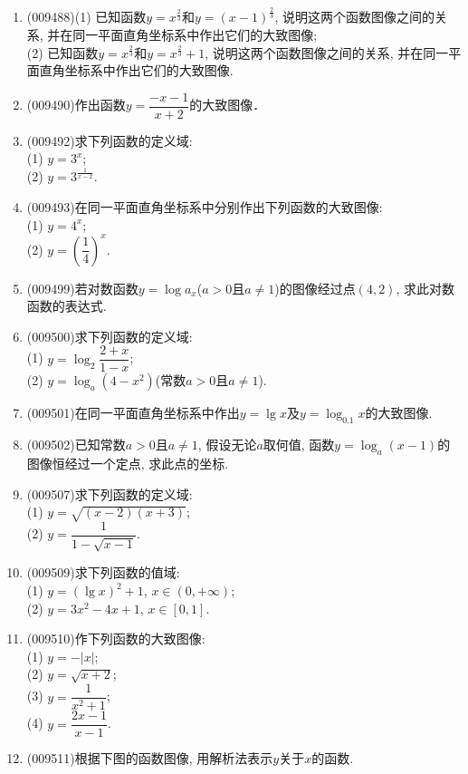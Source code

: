 \documentclass[10pt,a4paper]{article}
\begin{document}
\begin{enumerate}[1.]
\item {\tiny (009488)}(1) 已知函数$y=x^{\frac 23}$和$y=(x-1)^{\frac 23}$, 说明这两个函数图像之间的关系, 并在同一平面直角坐标系中作出它们的大致图像;\\
(2) 已知函数$y=x^{\frac 23}$和$y=x^{\frac 23}+1$, 说明这两个函数图像之间的关系, 并在同一平面直角坐标系中作出它们的大致图像.
\item {\tiny (009490)}作出函数$y=\dfrac{-x-1}{x+2}$的大致图像．
\item {\tiny (009492)}求下列函数的定义域:\\
(1) $y=3^x$;\\
(2) $y=3^{\frac 1{x-2}}$.
\item {\tiny (009493)}在同一平面直角坐标系中分别作出下列函数的大致图像:\\
(1) $y=4^x$;\\
(2) $y=(\dfrac 14)^x$.
\item {\tiny (009499)}若对数函数$y=\log a_x$($a>0$且$a\ne 1$)的图像经过点$(4, 2)$, 求此对数函数的表达式.
\item {\tiny (009500)}求下列函数的定义域:\\
(1) $y=\log_2\dfrac{2+x}{1-x}$;\\
(2) $y=\log_a(4-x^2)$(常数$a>0$且$a\ne 1$).
\item {\tiny (009501)}在同一平面直角坐标系中作出$y=\lg x$及$y=\log_{0.1}x$的大致图像.
\item {\tiny (009502)}已知常数$a>0$且$a\ne 1$, 假设无论$a$取何值, 函数$y=\log_a(x-1)$的图像恒经过一个定点, 求此点的坐标.
\item {\tiny (009507)}求下列函数的定义域:\\
(1) $y=\sqrt{(x-2)(x+3)}$;\\
(2) $y=\dfrac{1}{1-\sqrt{x-1}}$.
\item {\tiny (009509)}求下列函数的值域:\\
(1) $y=(\lg x)^2+1$, $x\in (0, +\infty)$;\\
(2) $y=3x^2-4x+1$, $x\in [0, 1]$.
\item {\tiny (009510)}作下列函数的大致图像:\\
(1) $y=-|x|$;\\
(2) $y= \sqrt{x+2}$;\\
(3) $y=\dfrac1{x^2+1}$;\\
(4) $y=\dfrac{2x-1}{x-1}$.
\item {\tiny (009511)}根据下图的函数图像, 用解析法表示$y$关于$x$的函数.
\begin{center}
\begin{tikzpicture}[>=latex,scale = 0.6]

\end{tikzpicture}
\end{center}
\end{enumerate}
\end{document}
